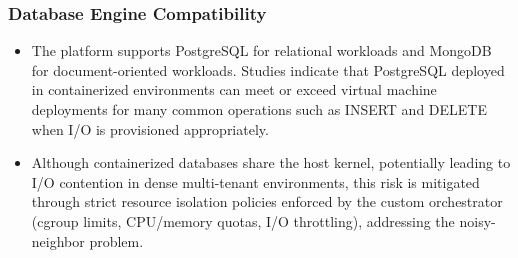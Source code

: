 \subsubsection*{Database Engine Compatibility}
\begin{itemize}
    \item The platform supports PostgreSQL for relational workloads and MongoDB for document-oriented workloads. Studies indicate that PostgreSQL deployed in containerized environments can meet or exceed virtual machine deployments for many common operations such as INSERT and DELETE when I/O is provisioned appropriately.
    \item Although containerized databases share the host kernel, potentially leading to I/O contention in dense multi-tenant environments, this risk is mitigated through strict resource isolation policies enforced by the custom orchestrator (cgroup limits, CPU/memory quotas, I/O throttling), addressing the noisy-neighbor problem.
\end{itemize}

